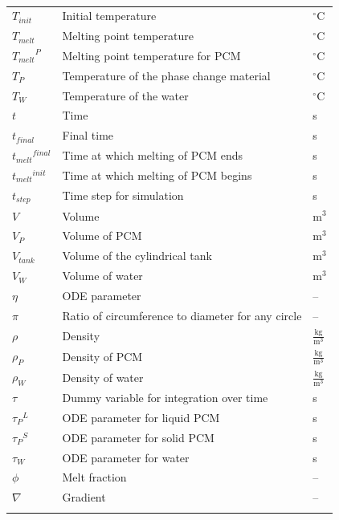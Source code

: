 \documentclass[12pt]{article}
\begin{document}
\begin{longtabu}{l X[l] l}
${T_{init}}$ & Initial temperature & ${}^{\circ}$C
\\
${T_{melt}}$ & Melting point temperature & ${}^{\circ}$C
\\
${{T_{melt}}^{P}}$ & Melting point temperature for PCM & ${}^{\circ}$C
\\
${T_{P}}$ & Temperature of the phase change material & ${}^{\circ}$C
\\
${T_{W}}$ & Temperature of the water & ${}^{\circ}$C
\\
$t$ & Time & s
\\
${t_{final}}$ & Final time & s
\\
${{t_{melt}}^{final}}$ & Time at which melting of PCM ends & s
\\
${{t_{melt}}^{init}}$ & Time at which melting of PCM begins & s
\\
${t_{step}}$ & Time step for simulation & s
\\
$V$ & Volume & $\text{m}^{3}$
\\
${V_{P}}$ & Volume of PCM & $\text{m}^{3}$
\\
${V_{tank}}$ & Volume of the cylindrical tank & $\text{m}^{3}$
\\
${V_{W}}$ & Volume of water & $\text{m}^{3}$
\\
$η$ & ODE parameter & --
\\
$π$ & Ratio of circumference to diameter for any circle & --
\\
$ρ$ & Density & $\frac{\text{kg}}{\text{m}^{3}}$
\\
${ρ_{P}}$ & Density of PCM & $\frac{\text{kg}}{\text{m}^{3}}$
\\
${ρ_{W}}$ & Density of water & $\frac{\text{kg}}{\text{m}^{3}}$
\\
$τ$ & Dummy variable for integration over time & s
\\
${{τ_{P}}^{L}}$ & ODE parameter for liquid PCM & s
\\
${{τ_{P}}^{S}}$ & ODE parameter for solid PCM & s
\\
${τ_{W}}$ & ODE parameter for water & s
\\
$ϕ$ & Melt fraction & --
\\
$∇$ & Gradient & --
\\
\bottomrule
\caption{}
\label{Table:ToS}
\end{longtabu}
\end{document}
